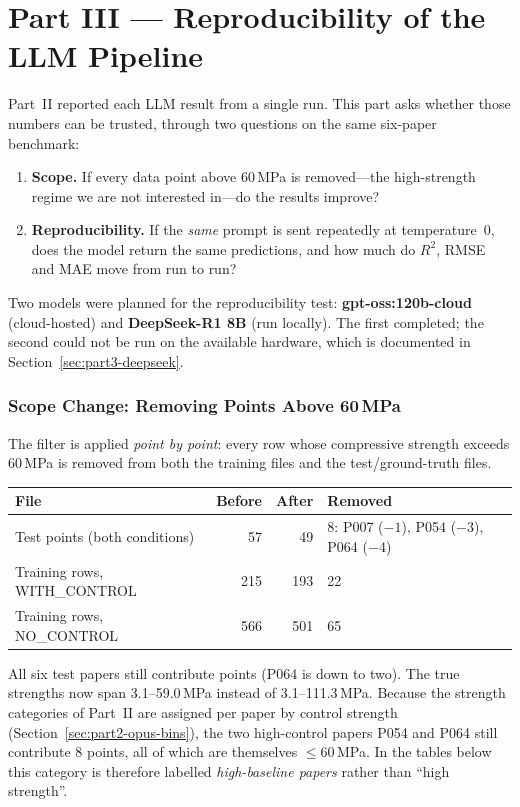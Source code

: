 \documentclass[11pt]{article}
\newcommand{\R}{$R^2$}
\begin{document}
\part*{Part III --- Reproducibility of the LLM Pipeline}
\label{sec:part3}

Part~II reported each LLM result from a single run. This part asks whether those
numbers can be trusted, through two questions on the same six-paper benchmark:
\begin{enumerate}\itemsep2pt
  \item \textbf{Scope.} If every data point above 60\,MPa is removed---the
        high-strength regime we are not interested in---do the results improve?
  \item \textbf{Reproducibility.} If the \emph{same} prompt is sent repeatedly at
        temperature~0, does the model return the same predictions, and how much do
        \R{}, RMSE and MAE move from run to run?
\end{enumerate}
Two models were planned for the reproducibility test: \textbf{gpt-oss:120b-cloud}
(cloud-hosted) and \textbf{DeepSeek-R1 8B} (run locally). The first completed; the second
could not be run on the available hardware, which is documented in
Section~\ref{sec:part3-deepseek}.

\section{Scope Change: Removing Points Above 60\,MPa}
\label{sec:part3-scope}
The filter is applied \emph{point by point}: every row whose compressive strength
exceeds 60\,MPa is removed from both the training files and the test/ground-truth files.

\begin{center}\small
\begin{tabular}{lrrl}
\toprule
File & Before & After & Removed \\
\midrule
Test points (both conditions) & 57 & 49 & 8: P007 ($-1$), P054 ($-3$), P064 ($-4$) \\
Training rows, WITH\_CONTROL & 215 & 193 & 22 \\
Training rows, NO\_CONTROL & 566 & 501 & 65 \\
\bottomrule
\end{tabular}
\end{center}

\noindent All six test papers still contribute points (P064 is down to two). The true
strengths now span 3.1--59.0\,MPa instead of 3.1--111.3\,MPa. Because the strength
categories of Part~II are assigned per paper by control strength
(Section~\ref{sec:part2-opus-bins}), the two high-control papers P054 and P064 still
contribute 8 points, all of which are themselves $\leq60$\,MPa. In the tables below this
category is therefore labelled \emph{high-baseline papers} rather than ``high strength''.
\end{document}
